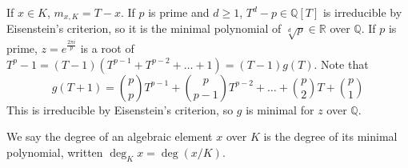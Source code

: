 \begin{example}
	If \( x \in K \), \( m_{x,K} = T - x \).
	If \( p \) is prime and \( d \geq 1 \), \( T^d - p \in \mathbb Q[T] \) is irreducible by Eisenstein's criterion, so it is the minimal polynomial of \( \sqrt[d]{p} \in \mathbb R \) over \( \mathbb Q \).
	If \( p \) is prime, \( z = e^{\frac{2\pi i}{p}} \) is a root of \( T^p - 1 = (T-1)(T^{p-1} + T^{p-2} + \dots + 1) = (T-1)g(T) \).
	Note that
	\[ g(T+1) = \binom p p T^{p-1} + \binom p {p-1} T^{p-2} + \dots + \binom p 2 T + \binom p 1 \]
	This is irreducible by Eisenstein's criterion, so \( g \) is minimal for \( z \) over \( \mathbb Q \).
\end{example}

We say the degree of an algebraic element \( x \) over \( K \) is the degree of its minimal polynomial, written \( \deg_K x = \deg(x/K) \).

